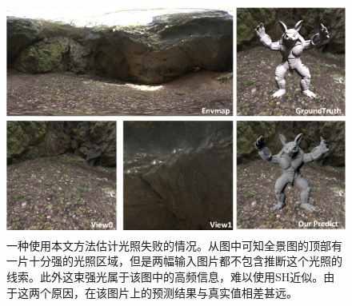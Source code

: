\begin{figure}
  \includegraphics[width=\columnwidth]{Img/fig-failure.png}
  \caption[光照预测失败的例子]{
    \label{fig:failure-case}
    一种使用本文方法估计光照失败的情况。从图中可知全景图的顶部有一片十分强的光照区域，但是两幅输入图片都不包含推断这个光照的线索。此外这束强光属于该图中的高频信息，难以使用SH近似。由于这两个原因，在该图片上的预测结果与真实值相差甚远。}
\end{figure}